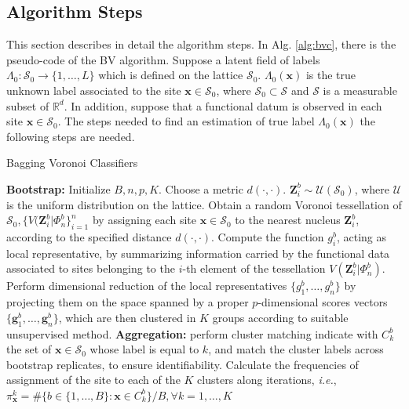 \subsection{Algorithm Steps}
\label{subsec:algsteps}
This section describes in detail the algorithm steps. In Alg. \ref{alg:bvc}, there is the pseudo-code of the BV algorithm. Suppose a latent field of labels $\Lambda_0:\mathcal{S}_0 \rightarrow \{1,\dots,L\}$ which is defined on the lattice $\mathcal{S}_0$. $\Lambda_0(\mathbf{x})$ is the true unknown label associated to the site $\mathbf{x}\in\mathcal{S}_0$, where $\mathcal{S}_0 \subset \mathcal{S}$ and $\mathcal{S}$ is a measurable subset of $\mathbb{R}^d$. In addition, suppose that a functional datum is observed in each site $\mathbf{x}\in\mathcal{S_0}$. The steps needed to find an estimation of true label $\Lambda_0(\mathbf{x})$ the following steps are needed.
\begin{algorithm}
\scriptsize
    \caption{\footnotesize{Bagging Voronoi Classifiers}}
    \label{alg:bvc}
    \begin{algorithmic}
    \STATE \textbf{Bootstrap:}
    \STATE Initialize $B, n, p, K$. Choose a metric $d(\cdot,\cdot).$
    \STATE $\mathbf{Z}_i^b\sim\mathcal{U}(\mathcal{S}_0)$, where $\mathcal{U}$ is the uniform distribution on the lattice. Obtain a random Voronoi tessellation of $\mathcal{S}_0, \{V(\mathbf{Z}_i^b|\Phi_n^b\}^n_{i=1}$ by assigning each site $\mathbf{x}\in \mathcal{S}_0$ to the nearest nucleus $\mathbf{Z}_i^b$, according to the specified distance $d(\cdot,\cdot).$
    \ENDFOR
    \STATE Compute the function $g_i^b$, acting as local representative, by summarizing information carried by the functional data associated to sites belonging to the $i$-th element of the tessellation $V(\mathbf{Z}_i^b|\Phi_n^b)$.
    \ENDFOR
    \STATE Perform dimensional reduction of the local representatives $\{g_1^b,\dots, g_n^b\}$ by projecting them on the space spanned by a proper $p$-dimensional scores vectors $\{\mathbf{g}_1^b,\dots, \mathbf{g}_n^b\}$, which are then clustered in $K$ groups according to suitable unsupervised method.
    \ENDFOR
    \STATE \textbf{Aggregation:} perform cluster matching
    \STATE indicate with $C_k^b$ the set of $\mathbf{x} \in \mathcal{S}_0$ whose label is equal to $k$, and match the cluster labels across bootstrap replicates, to ensure identifiability.
    \ENDFOR
    \ENDFOR
    \STATE Calculate the frequencies of assignment of the site to each of the $K$ clusters along iterations, \textit{i.e.}, $\pi_{\mathbf{x}}^k=\#\{b\in\{1,\dots,B\}:\mathbf{x}\in C_k^b\}/B, \forall k=1,\dots,K$
    \ENDFOR
    \end{algorithmic}
\end{algorithm} 
